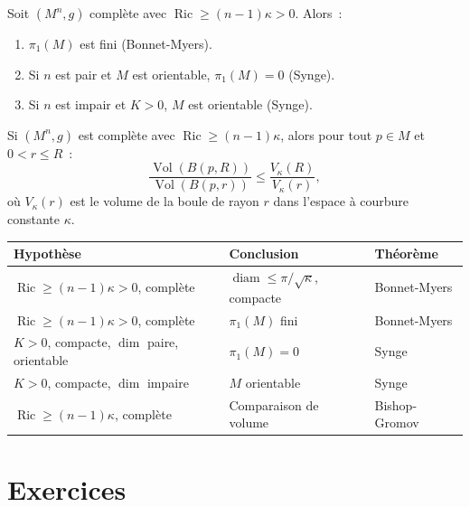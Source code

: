 \begin{proposition}
Soit $(M^n, g)$ compl\`ete avec $\operatorname{Ric} \geq (n-1)\kappa > 0$. Alors~:
\begin{enumerate}
    \item $\pi_1(M)$ est fini (Bonnet-Myers).
    \item Si $n$ est pair et $M$ est orientable, $\pi_1(M) = 0$ (Synge).
    \item Si $n$ est impair et $K > 0$, $M$ est orientable (Synge).
\end{enumerate}
\end{proposition}

\begin{theoreme}
Si $(M^n, g)$ est compl\`ete avec $\operatorname{Ric} \geq (n-1)\kappa$, alors pour
tout $p \in M$ et $0 < r \leq R$~:
\[
    \frac{\operatorname{Vol}(B(p, R))}{\operatorname{Vol}(B(p, r))}
    \leq \frac{V_\kappa(R)}{V_\kappa(r)},
\]
o\`u $V_\kappa(r)$ est le volume de la boule de rayon $r$ dans l'espace \`a courbure
constante $\kappa$.
\end{theoreme}

\begin{formules}[title=\textbf{R\'esum\'e des bornes de courbure et topologie}]
\begin{center}
\renewcommand{\arraystretch}{1.3}
\begin{tabular}{lll}
\textbf{Hypoth\`ese} & \textbf{Conclusion} & \textbf{Th\'eor\`eme} \\
\hline
$\operatorname{Ric} \geq (n-1)\kappa > 0$, compl\`ete
    & $\operatorname{diam} \leq \pi/\sqrt{\kappa}$, compacte
    & Bonnet-Myers \\
$\operatorname{Ric} \geq (n-1)\kappa > 0$, compl\`ete
    & $\pi_1(M)$ fini
    & Bonnet-Myers \\
$K > 0$, compacte, $\dim$ paire, orientable
    & $\pi_1(M) = 0$
    & Synge \\
$K > 0$, compacte, $\dim$ impaire
    & $M$ orientable
    & Synge \\
$\operatorname{Ric} \geq (n-1)\kappa$, compl\`ete
    & Comparaison de volume
    & Bishop-Gromov \\
\end{tabular}
\end{center}
\end{formules}

\section{Exercices}

